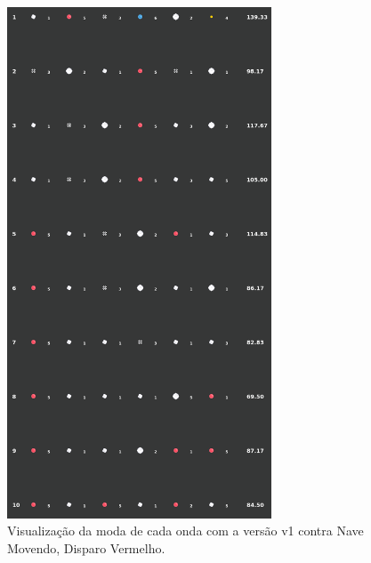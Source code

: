 \begin{figure}[H]
  \centering
  \includegraphics[width=0.7\textwidth]{figuras/ss/ss_redmove_ai_mode_1_1.png}
  \caption{Visualização da moda de cada onda com a versão v1 contra Nave Movendo, Disparo Vermelho.}
  \label{fig:ss-moda-rm-1-1}
\end{figure}


